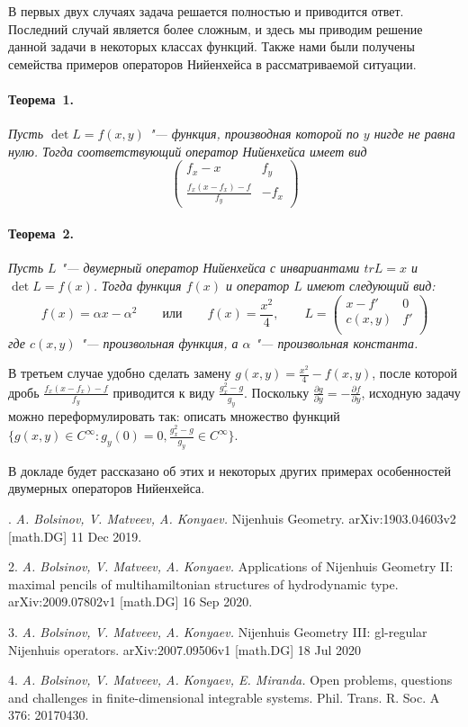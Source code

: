 В первых двух случаях задача решается полностью и приводится ответ.
Последний случай является более сложным, и здесь мы приводим решение данной задачи в некоторых классах функций.
Также нами были получены семейства примеров операторов Нийенхейса в рассматриваемой ситуации.

\paragraph{Теорема~1.}
{\it
Пусть $\det L = f(x,y)$ "--- функция, производная которой по $y$ нигде не равна нулю. Тогда соответствующий оператор Нийенхейса имеет вид
\begin{equation*}
\begin{pmatrix}
f_x - x & f_y \\
\frac{f_x(x - f_x) - f}{f_y} & -f_x
\end{pmatrix}
\end{equation*}
}

\paragraph{Теорема~2.}
{\it
Пусть $L$ "--- двумерный оператор Нийенхейса с инвариантами $tr L = x$ и $\det L = f(x)$. Тогда функция $f(x)$ и оператор $L$ имеют следующий вид:
$$
f(x) = \alpha x - \alpha^2
\qquad
\text{или}
\qquad
f(x) = \frac{x^2}{4},
\qquad
L =
\begin{pmatrix}
x - f' & 0 \\
c(x,y) & f' \\
\end{pmatrix}
$$
где $c(x,y)$ "--- произвольная функция, а $\alpha$ "--- произвольная константа.
}

В третьем случае удобно сделать замену $g(x,y) = \frac{x^2}{4} - f(x,y)$, после которой дробь $\frac{f_x(x - f_x) - f}{f_y}$ приводится
к виду $\frac{g^2_x - g}{g_y}$. Поскольку $\frac{\partial g}{\partial y} = - \frac{\partial f}{\partial y}$, исходную задачу можно переформулировать так:
описать множество функций $\lbrace g(x,y) \in C^{\infty} : g_y(0) = 0, \frac{g^2_x - g}{g_y} \in C^{\infty} \rbrace$.

В докладе будет рассказано об этих и некоторых других примерах особенностей двумерных операторов Нийенхейса.

. {\it A. Bolsinov, V. Matveev, A. Konyaev.} Nijenhuis Geometry. arXiv:1903.04603v2 [math.DG] 11 Dec 2019.

2. {\it A. Bolsinov, V. Matveev, A. Konyaev.} Applications of Nijenhuis Geometry II: maximal pencils of multihamiltonian structures of hydrodynamic type. arXiv:2009.07802v1 [math.DG] 16 Sep 2020.

3. {\it A. Bolsinov, V. Matveev, A. Konyaev.} Nijenhuis Geometry III: gl-regular Nijenhuis operators. arXiv:2007.09506v1 [math.DG] 18 Jul 2020

4. {\it A. Bolsinov, V. Matveev, A. Konyaev, E. Miranda.} Open problems, questions and challenges in finite-dimensional integrable systems. Phil. Trans. R. Soc. A 376: 20170430.
